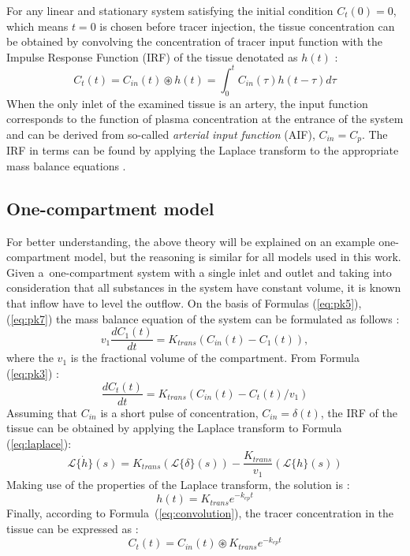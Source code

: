 For any linear and stationary system satisfying the 
initial condition $C_t(0) = 0$, which means $t = 0$ is chosen before tracer injection,
the tissue concentration can be obtained by convolving the concentration of tracer input function with the Impulse Response Function (IRF) of the tissue denotated as $h(t)$ \cite{sourbron2011scope}: 
\begin{equation}
	\label{eq:convolution}
	C_{t}(t) = C_{in}(t)\circledast h(t) = \int_{0}^{t}C_{in}(\tau)h(t-\tau)d\tau 
\end{equation}
When the only inlet of the examined tissue is an artery, the input function corresponds to the function of plasma concentration at the entrance of the system and can be derived from so-called \textit{arterial input function} (AIF), $C_{in} = C_{p}$. The IRF in terms can be found by applying the Laplace transform to the appropriate mass balance equations \cite{thesis}.
\newpage

\subsection{One-compartment model}
For better understanding, the above theory will be explained on an example one-compartment model, but the reasoning is similar for all models used in this work. Given a~one-compartment system with a single inlet and outlet and taking into consideration that all substances in the system have constant volume, it is known that inflow have to level the outflow. On the basis of Formulas (\ref{eq:pk5}), (\ref{eq:pk7}) the mass balance equation of the system can be formulated as follows \cite{thesis}:
\begin{equation}
v_1\frac{dC_1(t)}{dt} = K_{trans}(C_{in}(t)-C_1(t)),
\end{equation}
where the $v_1$ is the fractional volume of the compartment. From Formula (\ref{eq:pk3}) \cite{thesis}:
\begin{equation}
\frac{dC_t(t)}{dt} = K_{trans}(C_{in}(t)-C_t(t)/v_1)
\label{eq:laplace}
\end{equation}
Assuming that $C_{in}$ is a short pulse of concentration, $C_{in}=\delta(t)$, the IRF of the tissue can be obtained by applying the Laplace transform to Formula (\ref{eq:laplace}): 
\begin{equation}
\mathcal{L}\{\dot{h}\}(s) = K_{trans}(\mathcal{L}\{\delta\}(s)) - \frac{K_{trans}}{v_1}(\mathcal{L}\{h\}(s))
\end{equation}
Making use of the properties of the Laplace transform, the solution is \cite{thesis}:
\begin{equation}
h(t) = K_{trans}e^{-k_{ep}t}
\end{equation}
Finally, according to Formula~(\ref{eq:convolution}), the tracer concentration in the tissue can be expressed as \cite{thesis}:
\begin{equation}
	C_{t}(t) = C_{in}(t)\circledast  K_{trans}e^{-k_{ep}t} 
\end{equation}


